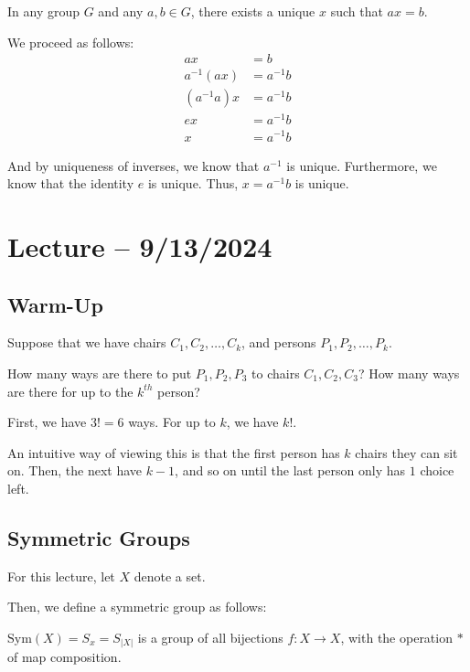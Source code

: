 \documentclass[openany]{book}
\begin{document}
\begin{cor}
	In any group $G$ and any $a, b \in G$, there exists a unique $x$ such that $ax = b$.
\end{cor}
\begin{solution}
	We proceed as follows:
	\begin{align*}
		ax &= b \\
		a^{-1}(ax) &= a^{-1}b \\
		(a^{-1}a)x &= a^{-1}b \\
		ex &= a^{-1}b \\
		x &= a^{-1}b
	\end{align*}

	And by uniqueness of inverses, we know that $a^{-1}$ is unique. Furthermore, we know that the identity $e$ is unique. Thus, $x = a^{-1}b$ is unique.
\end{solution}

\section{Lecture -- 9/13/2024}
\subsection{Warm-Up}
Suppose that we have chairs $C_1, C_2, \ldots, C_k$, and persons $P_1, P_2, \ldots, P_k$.

\begin{hw}
	How many ways are there to put $P_1, P_2, P_3$ to chairs $C_1, C_2, C_3$? How many ways are there for up to the $k^{th}$ person?
\end{hw}
\begin{solution}
	First, we have $3! = 6$ ways. For up to $k$, we have $k!$.
	
	An intuitive way of viewing this is that the first person has $k$ chairs they can sit on. Then, the next have $k-1$, and so on until the last person only has $1$ choice left.
\end{solution}

\subsection{Symmetric Groups}
For this lecture, let $X$ denote a set.

Then, we define a symmetric group as follows:
\begin{defn}
	$\mathrm{Sym}(X) = S_x = S_{\lvert X \rvert}$ is a group of all bijections $f : X \rightarrow X$, with the operation $*$ of map composition.
\end{defn}
\end{document}
